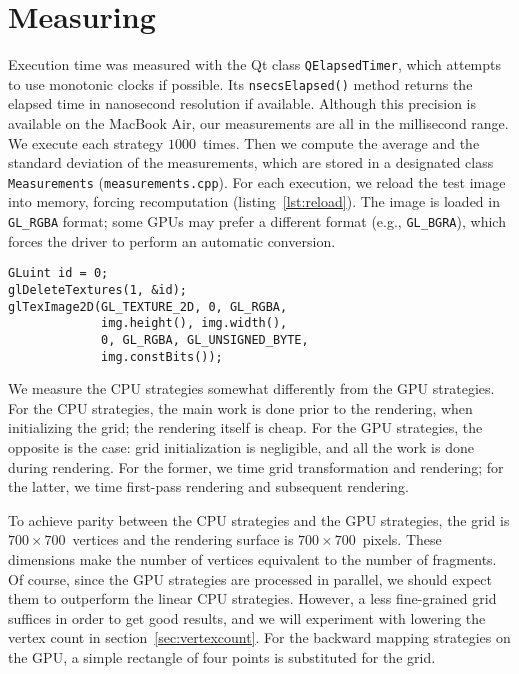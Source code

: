 \documentclass[english,12pt]{ifimaster}
\begin{document}
\section{Measuring}

Execution time was measured with the Qt class
\lstinline|QElapsedTimer|, which attempts to use monotonic clocks if
possible. Its \lstinline|nsecsElapsed()| method returns the elapsed
time in nanosecond resolution if available. Although this precision is
available on the MacBook Air, our measurements are all in the
millisecond range. We execute each strategy $1000$~times. Then we
compute the average and the standard deviation of the measurements,
which are stored in a designated class \lstinline|Measurements|
(\lstinline|measurements.cpp|). For each execution, we reload the test
image into memory, forcing recomputation (listing~\ref{lst:reload}).
The image is loaded in \lstinline|GL_RGBA| format; some GPUs may
prefer a different format (e.g., \lstinline|GL_BGRA|), which forces
the driver to perform an automatic conversion.


\begin{lstlisting}[float=b,frame=lines,label=lst:reload,caption=Reloading the image]
GLuint id = 0;
glDeleteTextures(1, &id);
glTexImage2D(GL_TEXTURE_2D, 0, GL_RGBA,
             img.height(), img.width(),
             0, GL_RGBA, GL_UNSIGNED_BYTE,
             img.constBits());
\end{lstlisting}

We measure the CPU strategies somewhat differently from the GPU
strategies. For the CPU strategies, the main work is done prior to the
rendering, when initializing the grid; the rendering itself is cheap.
For the GPU strategies, the opposite is the case: grid initialization
is negligible, and all the work is done during rendering. For the
former, we time grid transformation and rendering; for the latter, we
time first-pass rendering and subsequent rendering.

To achieve parity between the CPU strategies and the GPU strategies,
the grid is $700 \times 700$~vertices and the rendering surface is
$700 \times 700$~pixels. These dimensions make the number of vertices
equivalent to the number of fragments. Of course, since the GPU
strategies are processed in parallel, we should expect them to
outperform the linear CPU strategies. However, a less fine-grained
grid suffices in order to get good results, and we will experiment
with lowering the vertex count in section~\ref{sec:vertexcount}. For
the backward mapping strategies on the GPU, a simple rectangle of four
points is substituted for the grid.
\end{document}
